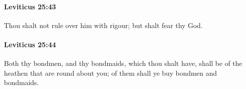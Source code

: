 		\paragraph{Leviticus 25:43} %
			\label{LEVITICUS-25-43}

			Thou shalt not rule over him with rigour; but shalt fear thy God.


		\paragraph{Leviticus 25:44} %
			\label{LEVITICUS-25-44}

			Both thy bondmen, and thy bondmaids, which thou shalt have, shall be of the heathen that are round about you; of them shall ye buy bondmen and bondmaids.


